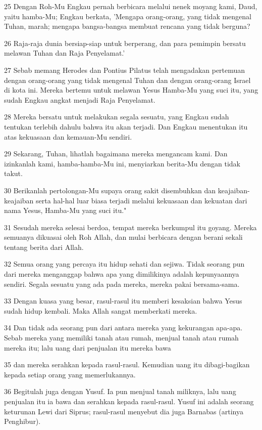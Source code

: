 \par 25 Dengan Roh-Mu Engkau pernah berbicara melalui nenek moyang kami, Daud, yaitu hamba-Mu; Engkau berkata, 'Mengapa orang-orang, yang tidak mengenal Tuhan, marah; mengapa bangsa-bangsa membuat rencana yang tidak berguna?
\par 26 Raja-raja dunia bersiap-siap untuk berperang, dan para pemimpin bersatu melawan Tuhan dan Raja Penyelamat.'
\par 27 Sebab memang Herodes dan Pontius Pilatus telah mengadakan pertemuan dengan orang-orang yang tidak mengenal Tuhan dan dengan orang-orang Israel di kota ini. Mereka bertemu untuk melawan Yesus Hamba-Mu yang suci itu, yang sudah Engkau angkat menjadi Raja Penyelamat.
\par 28 Mereka bersatu untuk melakukan segala sesuatu, yang Engkau sudah tentukan terlebih dahulu bahwa itu akan terjadi. Dan Engkau menentukan itu atas kekuasaan dan kemauan-Mu sendiri.
\par 29 Sekarang, Tuhan, lihatlah bagaimana mereka mengancam kami. Dan izinkanlah kami, hamba-hamba-Mu ini, menyiarkan berita-Mu dengan tidak takut.
\par 30 Berikanlah pertolongan-Mu supaya orang sakit disembuhkan dan keajaiban-keajaiban serta hal-hal luar biasa terjadi melalui kekuasaan dan kekuatan dari nama Yesus, Hamba-Mu yang suci itu."
\par 31 Sesudah mereka selesai berdoa, tempat mereka berkumpul itu goyang. Mereka semuanya dikuasai oleh Roh Allah, dan mulai berbicara dengan berani sekali tentang berita dari Allah.
\par 32 Semua orang yang percaya itu hidup sehati dan sejiwa. Tidak seorang pun dari mereka menganggap bahwa apa yang dimilikinya adalah kepunyaannya sendiri. Segala sesuatu yang ada pada mereka, mereka pakai bersama-sama.
\par 33 Dengan kuasa yang besar, rasul-rasul itu memberi kesaksian bahwa Yesus sudah hidup kembali. Maka Allah sangat memberkati mereka.
\par 34 Dan tidak ada seorang pun dari antara mereka yang kekurangan apa-apa. Sebab mereka yang memiliki tanah atau rumah, menjual tanah atau rumah mereka itu; lalu uang dari penjualan itu mereka bawa
\par 35 dan mereka serahkan kepada rasul-rasul. Kemudian uang itu dibagi-bagikan kepada setiap orang yang memerlukannya.
\par 36 Begitulah juga dengan Yusuf. Ia pun menjual tanah miliknya, lalu uang penjualan itu ia bawa dan serahkan kepada rasul-rasul. Yusuf ini adalah seorang keturunan Lewi dari Siprus; rasul-rasul menyebut dia juga Barnabas (artinya Penghibur).

